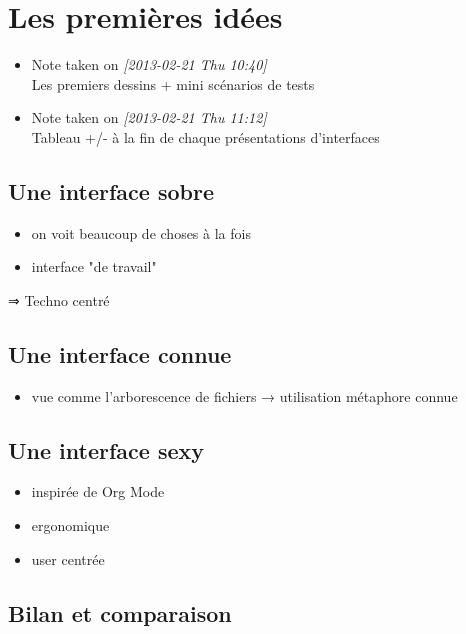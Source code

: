 \documentclass[11pt]{article}
\author{Grégoire Jadi}
\date{\today}
\title{}
\begin{document}
\tableofcontents

\section[Les premières idées]{Les premières idées}
\label{sec-1}
\begin{itemize}
\item Note taken on \textit{[2013-02-21 Thu 10:40]} \\
    Les premiers dessins + mini scénarios de tests
\item Note taken on \textit{[2013-02-21 Thu 11:12]} \\
    Tableau +/- à la fin de chaque présentations d'interfaces
\end{itemize}

\subsection[Une interface sobre]{Une interface sobre}
\label{sec-1-1}

\begin{itemize}
\item on voit beaucoup de choses à la fois
\item interface "de travail"
\end{itemize}

⇒ Techno centré

\subsection[Une interface connue]{Une interface connue}
\label{sec-1-2}
\begin{itemize}
\item vue comme l'arborescence de fichiers
→ utilisation métaphore connue
\end{itemize}
\subsection[Une interface sexy]{Une interface sexy}
\label{sec-1-3}

\begin{itemize}
\item inspirée de Org Mode
\item ergonomique
\item user centrée
\end{itemize}
\subsection[Bilan et comparaison]{Bilan et comparaison}
\label{sec-1-4}
\end{document}

